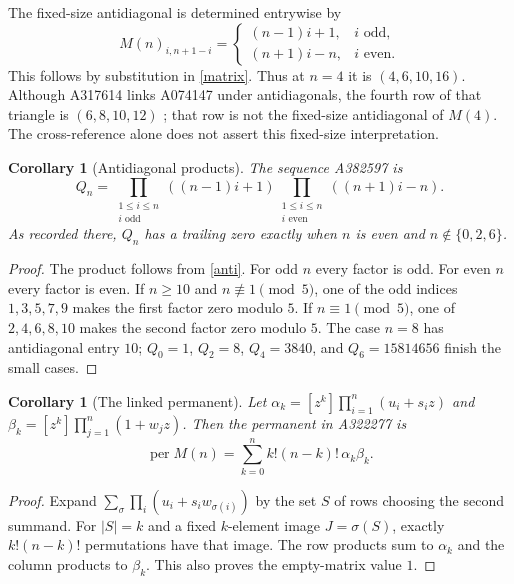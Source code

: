 \documentclass[11pt]{article}
\newtheorem{corollary}[theorem]{Corollary}
\begin{document}
The fixed-size antidiagonal is determined entrywise by
\begin{equation}\label{anti}
 M(n)_{i,n+1-i}=\begin{cases}(n-1)i+1,&i\text{ odd},\\
 (n+1)i-n,&i\text{ even}.
 \end{cases}
\end{equation}
This follows by substitution in \eqref{matrix}. Thus at $n=4$ it is
$(4,6,10,16)$. Although A317614 links A074147 under antidiagonals,
the fourth row of that triangle is $(6,8,10,12)$ \cite{antidiagonal};
that row is not the fixed-size antidiagonal of $M(4)$.
The cross-reference alone does not assert this fixed-size interpretation.

\begin{corollary}[Antidiagonal products]\label{antiproduct}
The sequence A382597 \cite{antiproductref} is
\[
 Q_n=\prod_{\substack{1\leq i\leq n\\ i\text{ odd}}}((n-1)i+1)
     \prod_{\substack{1\leq i\leq n\\ i\text{ even}}}((n+1)i-n).
\]
As recorded there, $Q_n$ has a trailing zero exactly when $n$ is even
and $n\notin\{0,2,6\}$.
\end{corollary}
\begin{proof}
The product follows from \eqref{anti}. For odd $n$ every factor is odd.
For even $n$ every factor is even. If $n\geq10$ and $n\not\equiv1\pmod5$,
one of the odd indices $1,3,5,7,9$ makes the first factor zero modulo $5$.
If $n\equiv1\pmod5$, one of $2,4,6,8,10$ makes the second factor zero
modulo $5$. The case $n=8$ has antidiagonal entry $10$;
$Q_0=1$, $Q_2=8$, $Q_4=3840$, and $Q_6=15814656$ finish the small cases.
\end{proof}

\begin{corollary}[The linked permanent]\label{permanent}
Let $\alpha_k=[z^k]\prod_{i=1}^n(u_i+s_i z)$ and
$\beta_k=[z^k]\prod_{j=1}^n(1+w_jz)$. Then the permanent in A322277
\cite{permanentref} is
\begin{equation}\label{permanentformula}
 \operatorname{per}M(n)=\sum_{k=0}^n k!(n-k)!\,\alpha_k\beta_k.
\end{equation}
\end{corollary}
\begin{proof}
Expand $\sum_\sigma\prod_i(u_i+s_iw_{\sigma(i)})$ by the set $S$ of rows
choosing the second summand. For $|S|=k$ and a fixed $k$-element image
$J=\sigma(S)$, exactly $k!(n-k)!$ permutations have that image.
The row products sum to $\alpha_k$ and the column products to $\beta_k$.
This also proves the empty-matrix value $1$.
\end{proof}
\end{document}
